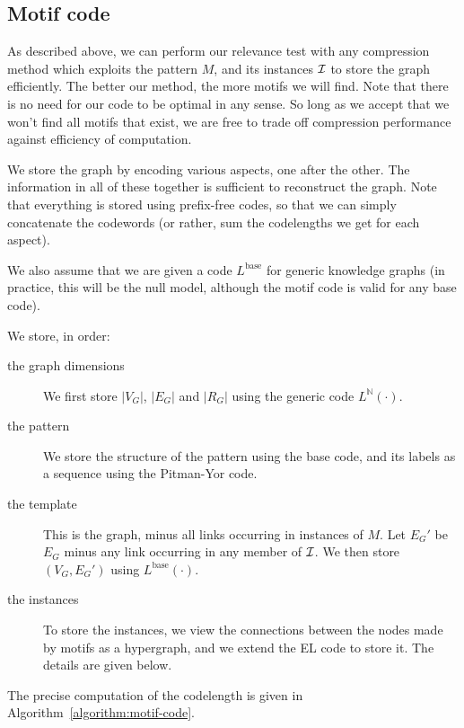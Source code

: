 \documentclass[letterpaper]{article} %
\newcommand{\N}{{\mathbb N}}
\newcommand{\I}{{\cal I}}
\begin{document}
\subsection{Motif code}

As described above, we can perform our relevance test with any compression method which exploits the pattern $M$, and its instances $\I$ to store the graph efficiently. The better our method, the more motifs we will find. Note that there is no need for our code to be optimal in any sense. So long as we accept that we won't find all motifs that exist, we are free to trade off compression performance against efficiency of computation.

We store the graph by encoding various aspects, one after the other. The information in all of these together is sufficient to reconstruct the graph. Note that everything is stored using prefix-free codes, so that we can simply concatenate the codewords (or rather, sum the codelengths we get for each aspect).

We also assume that we are given a code $L^\text{base}$ for generic knowledge graphs (in practice, this will be the null model, although the motif code is valid for any base code).

We store, in order:

\begin{description}
 \item[the graph dimensions] We first store $|V_G|$, $|E_G|$ and $|R_G|$ using the generic code $L^{\N}(\cdot)$. 
 \item[the pattern] We store the structure of the pattern using the base code, and its labels as a sequence using the Pitman-Yor code.
 \item[the template] This is the graph, minus all links occurring in instances of $M$. Let $E_G'$ be $E_G$ minus any link occurring in any member of $\cal I$. We then store $(V_G, E_G')$ using $L^\text{base}(\cdot)$.
 \item[the instances] To store the instances, we view the connections between the nodes made by motifs as a hypergraph, and we extend the EL code to store it. The details are given below.
\end{description}

The precise computation of the codelength is given in Algorithm~\ref{algorithm:motif-code}. 
\end{document}

